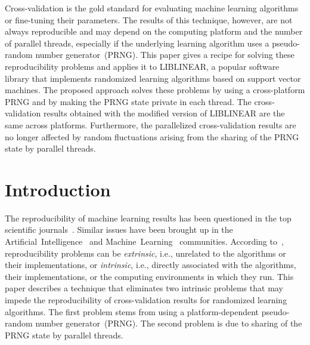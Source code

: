 \usetikzlibrary{arrows,calc,fit,matrix,positioning}

\newcommand{\CC}{C++}

Cross-validation is the gold standard for evaluating machine learning
algorithms or fine-tuning their parameters.
The results of this technique, however, are not always reproducible and may
depend on the computing platform and the number of parallel threads,
especially if the underlying learning algorithm uses a pseudo-random number
generator~(PRNG). This paper gives a recipe for solving these reproducibility problems and
applies it to LIBLINEAR\supercite{fan2008liblinear}, a popular software library
that implements randomized learning algorithms based on support vector
machines\supercite{vapnik1998statistical}. The proposed approach solves these
problems by using a cross-platform PRNG and by making the PRNG state private
in each thread. The cross-validation results obtained with the modified
version of LIBLINEAR are the same across platforms. Furthermore, the
parallelized cross-validation results are no longer affected by random
fluctuations arising from the sharing of the PRNG state by parallel threads.


\section{Introduction}


The reproducibility of machine learning results has been questioned in the top
scientific journals~\supercite{%
  barnes2010publish,
  peng2011reproducible,
  ince2012case,
  hutson2018artificial}. Similar issues have been brought up in the
Artificial~Intelligence~\supercite{henderson2017deep,gundersen2018state} and
Machine~Learning~\supercite{sculley2015hidden} communities.
According to~\citet{henderson2017deep}, reproducibility problems can be
\emph{extrinsic}, i.e., unrelated to the algorithms or their implementations,
or \emph{intrinsic}, i.e., directly associated with the algorithms, their
implementations, or the computing environments in which they run. This paper
describes a technique that eliminates two intrinsic problems that may impede
the reproducibility of cross-validation results for randomized learning algorithms.
The first problem stems from using a platform-dependent pseudo-random number
generator~(PRNG). The second problem is due to sharing of the PRNG state by
parallel threads.

